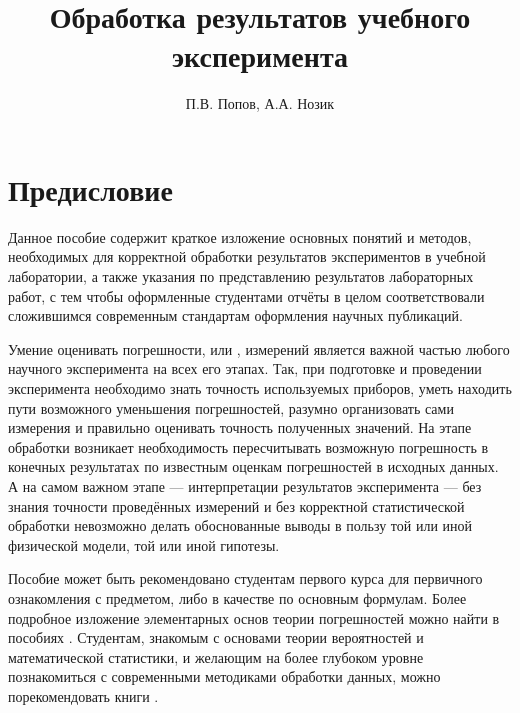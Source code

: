 \documentclass[a5paper,10pt,oneside]{report}
\begin{document}
\title{Обработка результатов учебного эксперимента}
\author{П.В. Попов, А.А. Нозик}

\maketitle

%    



\tableofcontents


\newpage 

\chapter*{Предисловие}
    Данное пособие содержит краткое изложение основных понятий и методов,
    необходимых для корректной обработки результатов экспериментов в учебной
    лаборатории, а также указания по представлению результатов лабораторных
    работ, с тем чтобы оформленные студентами отчёты в целом соответствовали
    сложившимся современным стандартам оформления научных публикаций.

    Умение оценивать погрешности, или , измерений
    является важной частью любого научного эксперимента на всех его этапах.
    Так, при подготовке и проведении эксперимента необходимо знать точность
    используемых приборов, уметь находить пути возможного уменьшения погрешностей,
    разумно организовать сами измерения и правильно оценивать точность
    полученных значений. На этапе обработки возникает необходимость пересчитывать
    возможную погрешность в конечных результатах по известным оценкам погрешностей
    в исходных данных. А на самом важном этапе --- интерпретации
    результатов эксперимента --- без знания точности проведённых
    измерений и без корректной статистической обработки невозможно делать
    обоснованные выводы в пользу той или иной физической модели, той или
    иной гипотезы.

    Пособие может быть рекомендовано студентам первого курса для первичного
    ознакомления с предметом, либо в качестве 
    по основным формулам. Более подробное
    изложение элементарных основ теории погрешностей можно найти в пособиях \cite{taylor,squires,zaidel}. 
    Студентам, знакомым с основами теории вероятностей и математической 
    статистики, и желающим на более глубоком уровне познакомиться с современными методиками обработки данных, можно порекомендовать книги \cite{hudson,idie}.
    
\end{document}
